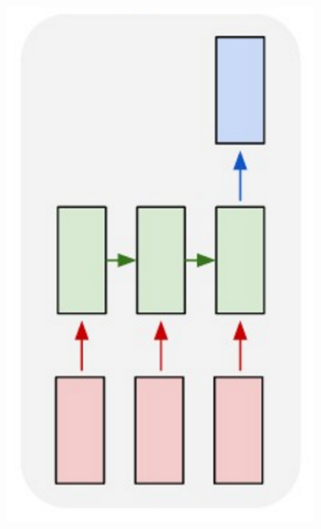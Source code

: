 \documentclass[12pt,a4paper]{amsart}
\begin{document}
\begin{figure}[!h]
	\begin{subfigure}{0.31\textwidth}
		\includegraphics[scale=0.5]{imgs/rnn-many-to-one.png}
		\caption{}
		\label{fig:rnn-variants-many-to-one}
	\end{subfigure}\hfill
	\begin{subfigure}{0.31\textwidth}

\end{subfigure}
\end{figure}
\end{document}
